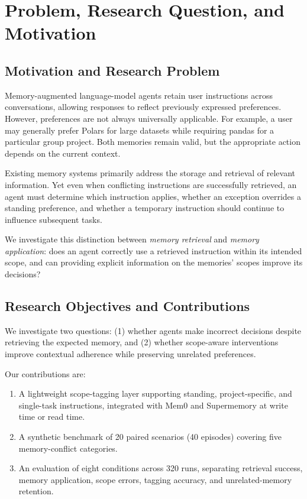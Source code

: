 \section{Problem, Research Question, and Motivation}
\label{sec:introduction}

\subsection{Motivation and Research Problem}

Memory-augmented language-model agents retain user instructions
across conversations, allowing responses to reflect previously
expressed preferences. However, preferences are not always
universally applicable. For example, a user may generally prefer Polars for
large datasets while requiring pandas for a particular group
project. Both memories remain valid, but the appropriate action
depends on the current context.

Existing memory systems primarily address the storage and
retrieval of relevant information. Yet even when conflicting
instructions are successfully retrieved, an agent must determine
which instruction applies, whether an exception overrides a
standing preference, and whether a temporary instruction should
continue to influence subsequent tasks.

We investigate this distinction between \emph{memory retrieval}
and \emph{memory application}: does an agent correctly use a
retrieved instruction within its intended scope, and can providing
explicit information on the memories' scopes improve its decisions?

\subsection{Research Objectives and Contributions}

We investigate two questions: (1) whether agents make incorrect
decisions despite retrieving the expected memory, and (2) whether
scope-aware interventions improve contextual adherence while
preserving unrelated preferences.

Our contributions are:
\begin{enumerate}
    \item A lightweight scope-tagging layer supporting standing,
    project-specific, and single-task instructions, integrated
    with Mem0 and Supermemory at write time or read time.
    \item A synthetic benchmark of 20 paired scenarios (40
    episodes) covering five memory-conflict categories.
    \item An evaluation of eight conditions across 320 runs,
    separating retrieval success, memory application, scope
    errors, tagging accuracy, and unrelated-memory retention.
\end{enumerate}
